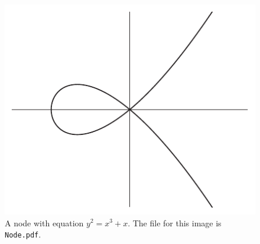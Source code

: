 

\usepackage{epstopdf}
\usepackage{amsmath, amssymb, amsthm}
\usepackage{enumitem}
\usepackage[toc,page]{appendix}
\usepackage{dsfont}
\usepackage{bbm}
\usepackage{url}
\usepackage{hyperref}
\usepackage[bottom]{footmisc}
\usepackage{footnote}
\usepackage{marginnote}
\usepackage{threeparttablex}
\usepackage{fmtcount}
\usepackage[usenames,dvipsnames,svgnames,table]{xcolor}
\usepackage[all,cmtip]{xy}
\let\objectstyle=\displaystyle
\usepackage[noabbrev,nameinlink]{cleveref}
\usepackage{tikz}
\usepackage{tkz-fct}
\usepackage{pgfplots}
\usepackage{graphicx}
\usepackage[lite]{amsrefs}




\usetikzlibrary{matrix}
\usetikzlibrary{arrows}
\usetikzlibrary{decorations.pathmorphing}
\usetikzlibrary{trees}


\newtheorem*{wrn}{Warning}
\newtheorem{thm}{Theorem}
\newtheorem{lem}[thm]{Lemma}
\newtheorem{prop}[thm]{Proposition}
\newtheorem{cor}[thm]{Corollary}
\newtheorem{claim}{Claim}
\theoremstyle{definition}
\newtheorem{problem}{Problem}
\newtheorem{case}{Case}
\newtheorem{defn}{Definition}
\newtheorem{ntn}{Notation}
\newtheorem{conj}{Conjecture}
\newtheorem{exmp}{Example}
\newtheorem{exmps}[exmp]{Examples}
\newtheorem{counter}[exmp]{Counterexample}
\newtheorem{rem}{Remark}
\theoremstyle{remark}





\begin{figure}
\centering
\includegraphics[width=0.4\linewidth]{Node/Node}
\caption{A node with equation $ y^{2} = x^{3} + x $. The file for this image is \texttt{Node.pdf}.}
\label{fig:Node}
\end{figure}

